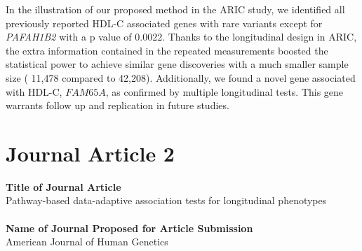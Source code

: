 \documentclass[12pt]{article}
\begin{document}
In the illustration of our proposed method in the ARIC study, we identified all previously reported HDL-C associated genes with rare variants except for \textit{PAFAH1B2} with a p value of 0.0022. Thanks to the longitudinal design in ARIC, the extra information contained in the repeated measurements boosted the statistical power to achieve similar gene discoveries with a much smaller sample size ( 11,478 compared to 42,208). Additionally, we found a novel gene associated with HDL-C, $FAM65A$, as confirmed by multiple longitudinal tests. This gene warrants follow up and replication in future studies. 

\newpage
\section{Journal Article 2}\label{JA_2}
\textbf{Title of Journal Article}\\
Pathway-based data-adaptive association tests for longitudinal phenotypes\\\\

\textbf{Name of Journal Proposed for Article Submission}\\
American Journal of Human Genetics\\
\newpage
\end{document}
